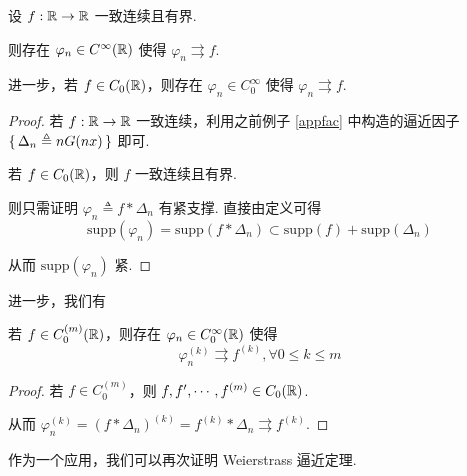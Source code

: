 \begin{property}
    设 $f:\mathbb{R}\to\mathbb{R}$ 一致连续且有界.

    则存在 $\varphi_n\in C^{\infty}(\mathbb{R})$ 使得 $\varphi_n\rightrightarrows f$.

    进一步，若 $f\in C_0(\mathbb{R})$，则存在 $\varphi_n\in C_0^\infty$ 使得 $\varphi_n\rightrightarrows f$.
\end{property}
\begin{proof}
    若 $f:\mathbb{R}\to\mathbb{R}$ 一致连续，利用之前例子 \ref{appfac} 中构造的逼近因子 $\set{\Delta_n\triangleq nG(nx)}$ 即可.

    若 $f\in C_0(\mathbb{R})$，则 $f$ 一致连续且有界.

    则只需证明 $\varphi_n\triangleq f*\Delta_n$ 有紧支撑. 直接由定义可得
$$
\mathrm{supp}(\varphi_n)=\mathrm{supp}(f*\Delta_n)\subset\mathrm{supp}(f)+\mathrm{supp}(\Delta_n)
$$

    从而 $\mathrm{supp}(\varphi_n)$ 紧.
\end{proof}

进一步，我们有

\begin{inference}
    若 $f\in C_0^{(m)}(\mathbb{R})$，则存在 $\varphi_n\in C_0^\infty(\mathbb{R})$ 使得
$$
\varphi_n^{(k)}\rightrightarrows f^{(k)},\forall 0\le k\le m
$$
\end{inference}
\begin{proof}
    若 $f\in C_0^{(m)}$，则 $f,f',\cdots,f^{(m)}\in C_0(\mathbb{R})$.

    从而 $\varphi_n^{(k)}=(f*\Delta_n)^{(k)}=f^{(k)}*\Delta_n\rightrightarrows f^{(k)}$.
\end{proof}

作为一个应用，我们可以再次证明 Weierstrass 逼近定理.

